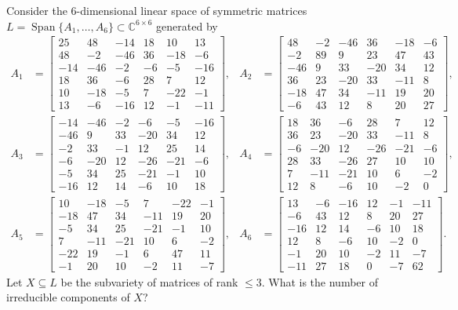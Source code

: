 Consider the $6$-dimensional linear space of symmetric matrices $L = \operatorname{Span}\{A_1,\dots,A_6\}\subset \mathbb C^{6\times 6}$ generated by
\begin{align*}
A_1 &= \begin{bmatrix}
25&48&-14&18&10&13\\
48&-2&-46&36&-18&-6\\
-14&-46&-2&-6&-5&-16\\
18&36&-6&28&7&12\\
10&-18&-5&7&-22&-1\\
13&-6&-16&12&-1&-11
\end{bmatrix}, & A_2 &= \begin{bmatrix}
48&-2&-46&36&-18&-6\\
-2&89&9&23&47&43\\
-46&9&33&-20&34&12\\
36&23&-20&33&-11&8\\
-18&47&34&-11&19&20\\
-6&43&12&8&20&27
\end{bmatrix},\\[1ex]
A_3 &= \begin{bmatrix}
-14&-46&-2&-6&-5&-16\\
-46&9&33&-20&34&12\\
-2&33&-1&12&25&14\\
-6&-20&12&-26&-21&-6\\
-5&34&25&-21&-1&10\\
-16&12&14&-6&10&18
\end{bmatrix}, & A_4 &= \begin{bmatrix}
18&36&-6&28&7&12\\
36&23&-20&33&-11&8\\
-6&-20&12&-26&-21&-6\\
28&33&-26&27&10&10\\
7&-11&-21&10&6&-2\\
12&8&-6&10&-2&0
\end{bmatrix},\\[1ex]
A_5 &= \begin{bmatrix}
10&-18&-5&7&-22&-1\\
-18&47&34&-11&19&20\\
-5&34&25&-21&-1&10\\
7&-11&-21&10&6&-2\\
-22&19&-1&6&47&11\\
-1&20&10&-2&11&-7
\end{bmatrix}, & A_6 &= \begin{bmatrix}
13&-6&-16&12&-1&-11\\
-6&43&12&8&20&27\\
-16&12&14&-6&10&18\\
12&8&-6&10&-2&0\\
-1&20&10&-2&11&-7\\
-11&27&18&0&-7&62
\end{bmatrix}.
\end{align*}
Let $X \subseteq L$ be the subvariety of matrices of rank $\leq 3$. What is the number of irreducible components of $X$?
